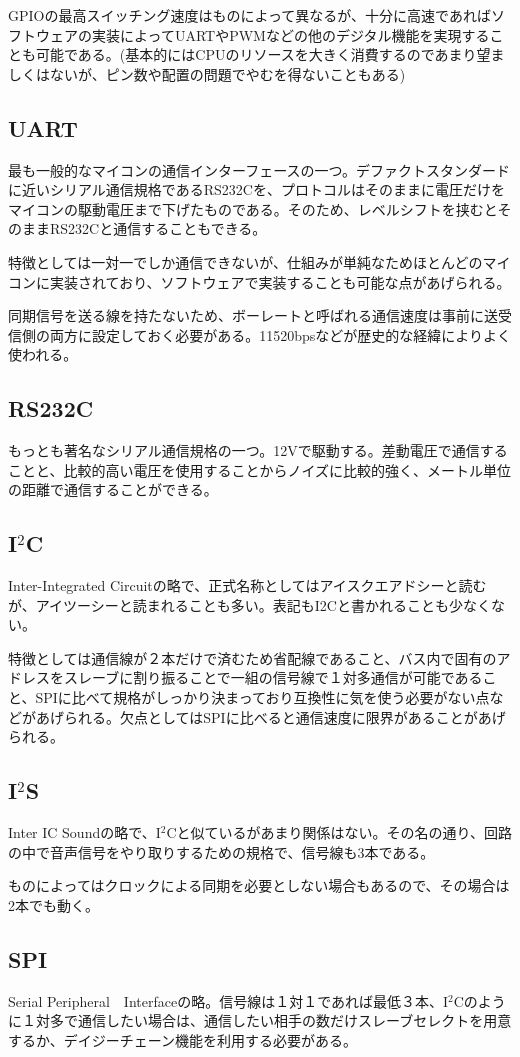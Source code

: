 \documentclass[a4paper,titlepage,here]{ujarticle}
\begin{document}
GPIOの最高スイッチング速度はものによって異なるが、十分に高速であればソフトウェアの実装によってUARTやPWMなどの他のデジタル機能を実現することも可能である。(基本的にはCPUのリソースを大きく消費するのであまり望ましくはないが、ピン数や配置の問題でやむを得ないこともある)
\subsection{UART}
最も一般的なマイコンの通信インターフェースの一つ。デファクトスタンダードに近いシリアル通信規格であるRS232Cを、プロトコルはそのままに電圧だけをマイコンの駆動電圧まで下げたものである。そのため、レベルシフトを挟むとそのままRS232Cと通信することもできる。

特徴としては一対一でしか通信できないが、仕組みが単純なためほとんどのマイコンに実装されており、ソフトウェアで実装することも可能な点があげられる。

同期信号を送る線を持たないため、ボーレートと呼ばれる通信速度は事前に送受信側の両方に設定しておく必要がある。11520bpsなどが歴史的な経緯によりよく使われる。
\subsection{RS232C}
もっとも著名なシリアル通信規格の一つ。12Vで駆動する。差動電圧で通信することと、比較的高い電圧を使用することからノイズに比較的強く、メートル単位の距離で通信することができる。
\subsection{I$^2$C}
Inter-Integrated Circuitの略で、正式名称としてはアイスクエアドシーと読むが、アイツーシーと読まれることも多い。表記もI2Cと書かれることも少なくない。

特徴としては通信線が２本だけで済むため省配線であること、バス内で固有のアドレスをスレーブに割り振ることで一組の信号線で１対多通信が可能であること、SPIに比べて規格がしっかり決まっており互換性に気を使う必要がない点などがあげられる。欠点としてはSPIに比べると通信速度に限界があることがあげられる。
\subsection{I$^2$S}
Inter IC Soundの略で、I$^2$Cと似ているがあまり関係はない。その名の通り、回路の中で音声信号をやり取りするための規格で、信号線も3本である。

ものによってはクロックによる同期を必要としない場合もあるので、その場合は2本でも動く。
\subsection{SPI}
Serial Peripheral　Interfaceの略。信号線は１対１であれば最低３本、I$^2$Cのように１対多で通信したい場合は、通信したい相手の数だけスレーブセレクトを用意するか、デイジーチェーン機能を利用する必要がある。
\end{document}
